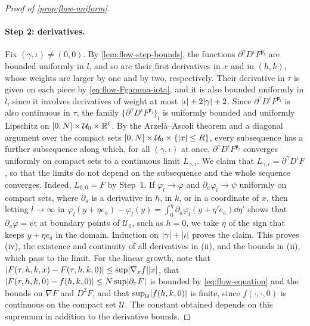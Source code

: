 \begin{proof}[Proof of \cref{prop:flow-uniform}]
\paragraph{Step 2: derivatives.} Fix $(\gamma,\iota)\ne(0,0)$. By
\cref{lem:flow-step-bounds}, the functions $\partial^\gamma D^\iota F^{\mathfrak p_l}$ are
bounded uniformly in $l$, and so are their first derivatives in $x$ and in
$(h,k)$, whose weights are larger by one and by two, respectively. Their derivative in
$\tau$ is given on each piece by \eqref{eq:flow-Fgamma-iota}, and it is also bounded
uniformly in $l$, since it involves derivatives of weight at most
$\lvert \iota\rvert+2\lvert \gamma\rvert+2$. Since $\partial^\gamma D^\iota F^{\mathfrak p_l}$ is also continuous in
$\tau$, the family $\{\partial^\gamma D^\iota F^{\mathfrak p_l}\}_l$ is uniformly bounded and uniformly
Lipschitz on $[0,N]\times\mathcal U_0\times\mathbb R^\ell$. By the Arzel\`a--Ascoli
theorem and a diagonal argument over the compact sets
$[0,N]\times\mathcal U_0\times\{\lvert x\rvert\le R\}$, every subsequence has a further
subsequence along which, for all $(\gamma,\iota)$ at once,
$\partial^\gamma D^\iota F^{\mathfrak p_l}$ converges uniformly on compact sets to a continuous
limit $L_{\gamma,\iota}$. We claim that $L_{\gamma,\iota}=\partial^\gamma
D^\iota F$, so that the limits do not depend on the subsequence and the
whole sequence converges. Indeed, $L_{0,0}=F$ by Step~1. If $\varphi_l\to\varphi$ and
$\partial_a\varphi_l\to\psi$ uniformly on compact sets, where $\partial_a$ is a
derivative in $h$, in $k$, or in a coordinate of $x$, then letting
$l\to\infty$ in $\varphi_l(y+\eta e_a)-\varphi_l(y)=\int_0^\eta\partial_a\varphi_l(y+\eta'e_a)\dd\eta'$
shows that $\partial_a\varphi=\psi$; at boundary points of $\mathcal U_0$, such as $h=0$,
we take $\eta$ of the sign that keeps $y+\eta e_a$ in the domain. Induction on $\lvert \gamma\rvert+\lvert \iota\rvert$
proves the claim. This proves (iv), the existence and continuity of all
derivatives in (ii), and the bounds in (ii), which pass to the limit. For the
linear growth, note that $\lvert F(\tau,h,k,x)-F(\tau,h,k,0)\rvert\le\sup\lvert \nabla_xf\rvert
\lvert x\rvert$, that $\lvert F(\tau,h,k,0)-f(h,k,0)\rvert\le N\sup\lvert \partial_\tau F\rvert$ is
bounded by \eqref{eq:flow-equation} and the bounds on $\nabla F$ and $D^2F$, and
that $\sup_{\mathcal U}\lvert f(h,k,0)\rvert$ is finite, since $f(\cdot,\cdot,0)$ is
continuous on the compact set $\mathcal U$. The constant obtained depends on this
supremum in addition to the derivative bounds.


\end{proof}
